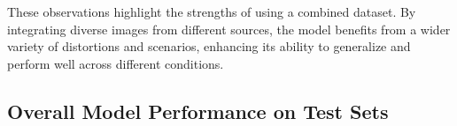 
\noindent
These observations highlight the strengths of using a combined dataset. By integrating diverse images from different sources, the model benefits from a wider variety of distortions and scenarios, enhancing its ability to generalize and perform well across different conditions. \par

\subsection{Overall Model Performance on Test Sets}
\label{subsec:OverallModelPerformance}
